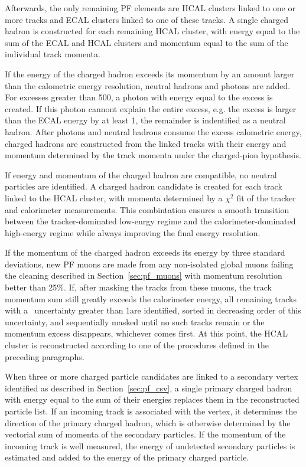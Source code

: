 Afterwards, the only remaining PF elements are HCAL clusters linked to one or more tracks and ECAL clusters linked to one of these tracks.
A single charged hadron is constructed for each remaining HCAL cluster, with energy equal to the sum of the ECAL and HCAL clusters and momentum equal to the sum of the individual track momenta.

If the energy of the charged hadron exceeds its momentum by an amount larger than the calometric energy resolution, neutral hadrons and photons are added.
For excesses greater than 500\MeV, a photon with energy equal to the excess is created.
If this photon cannont explain the entire excess, e.g. the excess is larger than the ECAL energy by at least 1\GeV, the remainder is indentified as a neutral hadron. 
After photons and neutral hadrons consume the excess calometric energy, charged hadrons are constructed from the linked tracks with their energy and momentum determined by the track momenta under the charged-pion hypothesis. 

If energy and momentum of the charged hadron are compatible, no neutral particles are identified. A charged hadron candidate is created for each track linked to the HCAL cluster, with momenta determined by a $\chi^2$ fit of the tracker and calorimeter measurements.
This combintation ensures a smooth transition between the tracker-dominated low-enrgy regime and the calorimeter-dominated high-energy regime while always improving the final energy resolution. 

If the momentum of the charged hadron exceeds its energy by three standard deviations, new PF muons are made from any non-isolated global muons failing the cleaning described in Section~\ref{sec:pf_muons} with momentum resolution better than 25\%.
If, after masking the tracks from these muons, the track momentum sum still greatly exceeds the calorimeter energy, all remaining tracks with a \pt\ uncertainty greater than 1\GeV are identified, sorted in decreasing order of this uncertainty, and sequentially masked until no such tracks remain or the momentum excess disappears, whichever comes first. 
At this point, the HCAL cluster is reconstructed according to one of the procedures defined in the preceding paragraphs.

When three or more charged particle candidates are linked to a secondary vertex identified as described in Section~\ref{sec:pf_csv}, a single primary charged hadron with energy equal to the sum of their energies replaces them in the reconstructed particle list.
If an incoming track is associated with the vertex, it determines the direction of the primary charged hadron, which is otherwise determined by the vectorial sum of momenta of the secondary particles.
If the momentum of the incoming track is well measured, the energy of undetected secondary particles is estimated and added to the energy of the primary charged particle.

